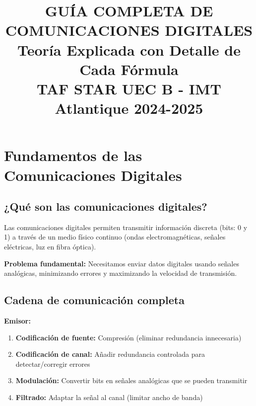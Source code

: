 \documentclass[11pt,a4paper]{article}
\title{\textbf{\LARGE GUÍA COMPLETA DE COMUNICACIONES DIGITALES}\\[0.5cm]
\Large Teoría Explicada con Detalle de Cada Fórmula\\[0.3cm]
\large TAF STAR UEC B - IMT Atlantique 2024-2025}
\author{}
\date{}
\begin{document}
\maketitle
\thispagestyle{empty}

\vspace{1cm}

\begin{center}
\end{center}

\newpage

\tableofcontents

\newpage

\section{Fundamentos de las Comunicaciones Digitales}

\subsection{¿Qué son las comunicaciones digitales?}

Las comunicaciones digitales permiten transmitir información discreta (bits: 0 y 1) a través de un medio físico continuo (ondas electromagnéticas, señales eléctricas, luz en fibra óptica).

\textbf{Problema fundamental:} Necesitamos enviar datos digitales usando señales analógicas, minimizando errores y maximizando la velocidad de transmisión.

\subsection{Cadena de comunicación completa}

\textbf{Emisor:}
\begin{enumerate}
\item \textbf{Codificación de fuente:} Compresión (eliminar redundancia innecesaria)
\item \textbf{Codificación de canal:} Añadir redundancia controlada para detectar/corregir errores
\item \textbf{Modulación:} Convertir bits en señales analógicas que se pueden transmitir
\item \textbf{Filtrado:} Adaptar la señal al canal (limitar ancho de banda)
\end{enumerate}
\end{document}
